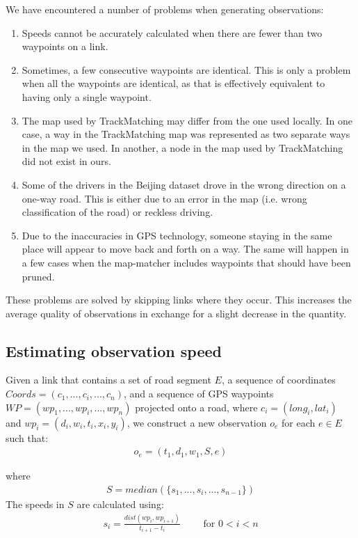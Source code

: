 We have encountered a number of problems when generating observations:

\begin{enumerate}
	\item Speeds cannot be accurately calculated when there are fewer than two waypoints on a link.
	\item Sometimes, a few consecutive waypoints are identical. This is only a problem when all the waypoints are identical, as that is effectively equivalent to having only a single waypoint.
	\item The map used by TrackMatching may differ from the one used locally. In one case, a way in the TrackMatching map was represented as two separate ways in the map we used. In another, a node in the map used by TrackMatching did not exist in ours.
	\item Some of the drivers in the Beijing dataset drove in the wrong direction on a one-way road. This is either due to an error in the map (i.e. wrong classification of the road) or reckless driving.
	\item Due to the inaccuracies in GPS technology, someone staying in the same place will appear to move back and forth on a way. The same will happen in a few cases when the map-matcher includes waypoints that should have been pruned.
\end{enumerate}

These problems are solved by skipping links where they occur. This increases the average quality of observations in exchange for a slight decrease in the quantity.

\subsection{Estimating observation speed}\label{KR:speed} 
Given a link that contains a set of road segment $E$, a sequence of coordinates $Coords = (c_1,...,c_i,...,c_n)$, and a sequence of GPS waypoints $WP=(wp_1,...,wp_i,...,wp_n)$ projected onto a road, where $c_i = (long_i, lat_i)$ and $wp_i = (d_i, w_i, t_i, x_i, y_i)$, we construct a new observation $o_e$ for each $e \in E$ such that:
\begin{align*}
o_e = (t_1, d_1, w_1, S, e)
\end{align*}

where
\begin{align*}
S = median(\{s_1,...,s_i,...,s_{n-1}\})
\end{align*}
%
The speeds in $S$ are calculated using:
\begin{align*}
s_i = \frac{dist(wp_i, wp_{i+1})}{t_{i+1} - t_i} \qquad \text{ for } 0 < i < n
\end{align*}

